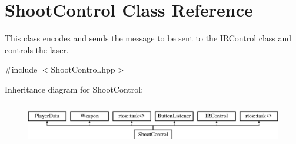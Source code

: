 \hypertarget{class_shoot_control}{}\section{Shoot\+Control Class Reference}
\label{class_shoot_control}


This class encodes and sends the message to be sent to the \mbox{\hyperlink{class_i_r_control}{I\+R\+Control}} class and controls the laser.  




{\ttfamily \#include $<$Shoot\+Control.\+hpp$>$}

Inheritance diagram for Shoot\+Control\+:\begin{figure}[H]
\begin{center}
\leavevmode
\includegraphics[height=1.866667cm]{class_shoot_control}
\end{center}
\end{figure}
